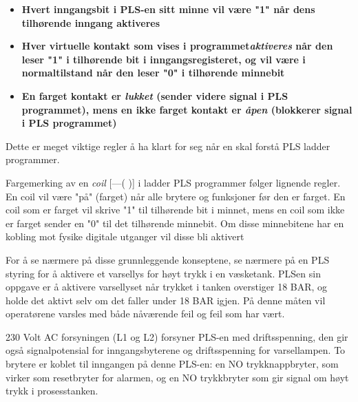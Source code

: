 \begin{itemize}

	\item \textbf{Hvert inngangsbit i PLS-en sitt minne vil være "1" når dens tilhørende inngang aktiveres}
	\item \textbf{Hver virtuelle kontakt som vises i programmet\textit{aktiveres} når den leser "1" i tilhørende bit i inngangsregisteret, og vil være i normaltilstand når den leser "0" i tilhørende minnebit}
	\item \textbf{En farget kontakt er \textit{lukket} (sender videre signal i PLS programmet), mens en ikke farget kontakt er \textit{åpen} (blokkerer signal i PLS programmet)}
\end{itemize}

Dette er meget viktige regler å ha klart for seg  når en skal forstå PLS ladder programmer. 



\vskip 10pt

Fargemerking av en \textit{coil} [---( )] i ladder PLS programmer følger lignende regler. En coil vil være "på" (farget) når alle brytere og funksjoner før den er farget. En coil som er farget vil skrive "1" til tilhørende bit i minnet, mens en coil som ikke er farget sender  en "0" til det tilhørende minnebit. Om disse minnebitene har en kobling mot fysike digitale utganger vil disse bli aktivert


\filbreak

For å se nærmere på disse grunnleggende konseptene, se nærmere på en PLS styring for å aktivere et varsellys for høyt trykk i en væsketank. PLSen sin oppgave er å aktivere varsellyset når trykket i tanken overstiger 18 BAR, og holde det aktivt selv om det faller under 18 BAR igjen. På denne måten vil operatørene varsles med både nåværende feil og feil som har vært.

230 Volt AC forsyningen (L1 og L2) forsyner PLS-en med driftsspenning, den gir også signalpotensial for inngangsbyterene og driftsspenning for varsellampen. To brytere er koblet til inngangen på denne PLS-en: en NO trykknappbryter, som virker som resetbryter for alarmen, og en NO trykkbryter som gir signal om høyt trykk i prosesstanken.


